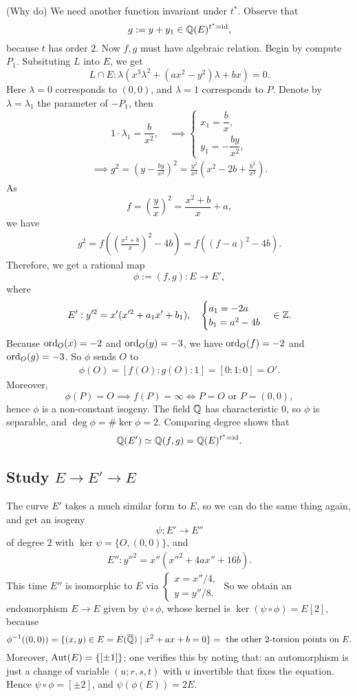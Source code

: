 (Why do) We need another function invariant under $t^*$.
Observe that \[g := y + y_1\in\mathbb{Q}(E)^{t^* = \operatorname{id}},\]
because $t$ has order $2$.
Now $f, g$ must have algebraic relation.
Begin by compute $P_1$.
Subsituting $L$ into $E$,
we get \[L\cap E : \lambda(x^3\lambda^2 + (ax^2 - y^2)\lambda + bx) = 0.\]
Here $\lambda = 0$ corresponds to $(0, 0)$,
and $\lambda = 1$ corresponds to $P$.
Denote by $\lambda = \lambda_1$ the parameter of $-P_1$,
then \[1\cdot \lambda_1 = \dfrac{b }{x^2},
\quad\implies\begin{cases}
    x_1 = \dfrac{b }{x},\\ y_1 = -\dfrac{by}{x^2},
\end{cases}\]
\begin{align*}
    \implies g^2 = \left( y - \frac{by}{x^2} \right)^2
    = \frac{y^2}{x^2}\left( x^2 - 2b + \frac{b^2}{x^2} \right).
\end{align*}
As \[f = \left( \frac{y}{x} \right)^2 = \frac{x^2+b}{x} + a,\]
we have \begin{align*}
    g^2 = f\left( \left( \frac{x^2+b}{x} \right)^2 - 4b \right) = f\left( (f-a)^2 - 4b \right).
\end{align*}
Therefore, we get a rational map\[\phi := (f, g) : E\to E',\]
where \[E' : y'^2 = x'(x'^2 + a_1x' + b_1),\quad\begin{cases}
    a_1 = -2a \\ b_1 = a^2 - 4b
\end{cases}\in\mathbb{Z}.\]
Because $\operatorname{ord}_O(x) = -2$ and $\operatorname{ord}_O(y) = -3$, we have $\operatorname{ord}_O(f) = -2$ and $\operatorname{ord}_O(g) = -3$.
So $\phi$ sends $O$ to \begin{align*}
    \phi(O) = \left[ f(O) : g(O) : 1 \right] = [0 : 1 : 0] = O'.
\end{align*}
Moreover, \[\phi(P) = O\implies f(P) = \infty\iff P = O\text{ or } P = (0, 0),\]
hence $\phi$ is a non-constant isogeny.
The field $\mathbb{Q}$ has characteristic $0$, so $\phi$
is separable, and $\deg \phi = \#\ker\phi = 2$.
Comparing degree shows that \[\mathbb{Q}(E')\simeq\mathbb{Q}(f, g) = \mathbb{Q}(E)^{t^* = \operatorname{id}}.\]

\subsection*{Study $E\to E'\to E$}
The curve $E'$ takes a much similar form to $E$,
so we can do the same thing again, and get an isogeny \[\psi : E'\to E''\]
of degree $2$ with $\ker\psi = \{O, (0, 0)\}$, and \begin{align*}
    E'' : y''^2 = x''(x''^2  + 4ax'' + 16b ).
\end{align*}
This time $E''$ is isomorphic to $E$ via \(\begin{cases}
    x = x''/4, \\ y = y''/8.
\end{cases}\)
So we obtain an endomorphism $E\to E$ given by $\psi\circ\phi$, whose kernel is $\ker (\psi\circ\phi) = E[2]$,
because \[\phi^{-1}((0, 0)) = \{(x, y)\in E = E(\overline{\mathbb{Q}})\mid x^2 + ax + b = 0\} = \text{ the other 2-torsion points on }E.\]
Moreover, $\operatorname{Aut}(E) = \{[\pm 1]\}$;
one verifies this by noting that: an automorphism is just a change of variable $(u; r, s, t)$ with $u$ invertible that fixes the equation.
Hence $\psi\circ\phi = [\pm 2]$,
and $\psi(\phi(E)) = 2E$.

